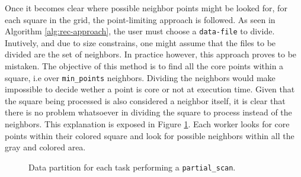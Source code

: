 \documentclass[10pt,journal,compsoc]{IEEEtran}
\let\MYoriglatexcaption\caption
\renewcommand{\caption}[2][\relax]{\MYoriglatexcaption[#2]{#2}}
\begin{document}
Once it becomes clear where possible neighbor points might be looked for, for each square in the grid, the point-limiting approach is followed. As seen in Algorithm \ref{alg:rec-approach}, the user must choose a \texttt{data-file} to divide. Inutively, and due to size constrains, one might assume that the files to be divided are the set of neighbors. In practice however, this approach proves to be mistaken. The objective of this method is to find all the core points within a square, i.e over \texttt{min\_points} neighbors. Dividing the neighbors would make impossible to decide wether a point is core or not at execution time. Given that the square being processed is also considered a neighbor itself, it is clear that there is no problem whatsoever in dividing the square to process instead of the neighbors. This explanation is exposed in Figure \ref{fig:p-scan-division}. Each worker looks for core points within their colored square and look for possible neighbors within all the gray and colored area.

\begin{figure}[!h]
\centering
{}
\caption{Data partition for each task performing a \texttt{partial\_scan}. \label{fig:p-scan-division}}
\end{figure}
\end{document}
